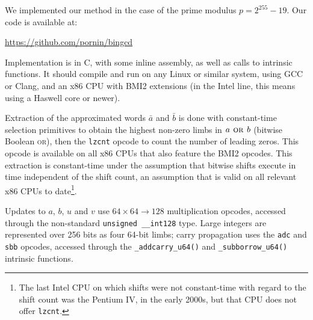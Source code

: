 \documentclass{llncs}
\begin{document}
We implemented our method in the case of the prime modulus
$p = 2^{255}-19$. Our code is available at:
\begin{center}
    \url{https://github.com/pornin/bingcd}
\end{center}
Implementation is in C, with some inline assembly, as well as calls to
intrinsic functions. It should compile and run on any Linux or similar
system, using GCC or Clang, and an x86 CPU with BMI2 extensions (in the
Intel line, this means using a Haswell core or newer).

Extraction of the approximated words $\bar a$ and $\bar b$ is done with
constant-time selection primitives to obtain the highest non-zero limbs
in $a \text{\textsc{\ or\ }} b$ (bitwise Boolean \textsc{or}), then
the \verb+lzcnt+ opcode to count the number of leading zeros. This
opcode is available on all x86 CPUs that also feature the BMI2 opcodes.
This extraction is constant-time under the assumption that bitwise shifts
execute in time independent of the shift count, an assumption that is
valid on all relevant x86 CPUs to date\footnote{The last Intel CPU on
which shifts were not constant-time with regard to the shift count was
the Pentium IV, in the early 2000s, but that CPU does not offer
\texttt{lzcnt}.}.

Updates to $a$, $b$, $u$ and $v$ use $64\times 64\rightarrow 128$
multiplication opcodes, accessed through the non-standard
\verb+unsigned __int128+ type. Large integers are represented over 256
bits as four 64-bit limbs; carry propagation uses the \verb+adc+ and
\verb+sbb+ opcodes, accessed through the \verb+_addcarry_u64()+ and
\verb+_subborrow_u64()+ intrinsic functions.
\end{document}

